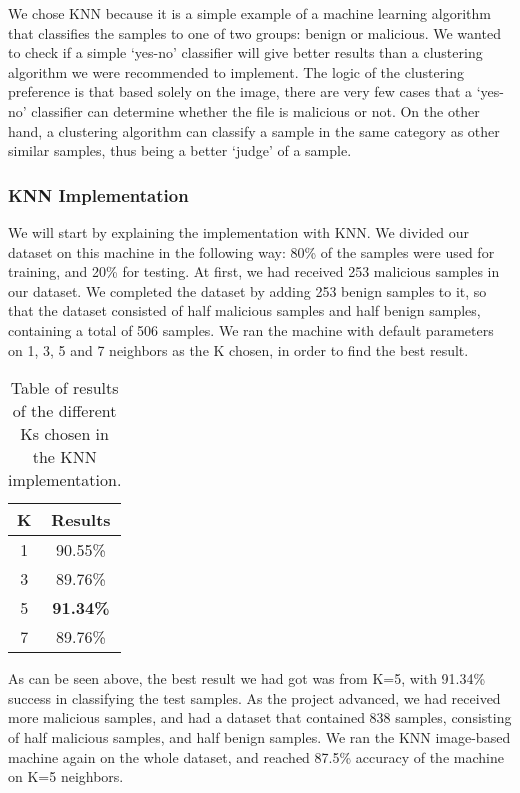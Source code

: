 \documentclass{article}
\begin{document}
\indent	We chose KNN because it is a simple example of a machine learning algorithm that classifies the samples to one of two groups: benign or malicious. We wanted to check if a simple ‘yes-no’ classifier will give better results than a clustering algorithm we were recommended to implement. The logic of the clustering preference is that based solely on the image, there are very few cases that a ‘yes-no’ classifier can determine whether the file is malicious or not. On the other hand, a clustering algorithm can classify a sample in the same category as other similar samples, thus being a better ‘judge’ of a sample.

\subsubsection{KNN Implementation}
\indent We will start by explaining the implementation with KNN. We divided our dataset on this machine in the following way: 80\% of the samples were used for training, and 20\% for testing. At first, we had received 253 malicious samples in our dataset. We completed the dataset by adding 253 benign samples to it, so that the dataset consisted of half malicious samples and half benign samples, containing a total of 506 samples. We ran the machine with default parameters on 1, 3, 5 and 7 neighbors as the K chosen, in order to find the best result.

\begin{table}[htb]
\centering
\begin{tabular}[c]{|c|c|}
\hline
K & Results\\
\hline
1 & 90.55\%\\
\hline
3 & 89.76\%\\
\hline
5 & \textbf{91.34\%}\\
\hline
7 & 89.76\%\\
\hline
\end{tabular}
\caption{Table of results of the different Ks chosen in the KNN implementation.}
\end{table}

\indent As can be seen above, the best result we had got was from K=5, with 91.34\% success in classifying the test samples. 	
\indent As the project advanced, we had received more malicious samples, and had a dataset that contained 838 samples, consisting of half malicious samples, and half benign samples. We ran the KNN image-based machine again on the whole dataset, and reached 87.5\% accuracy of the machine on K=5 neighbors.
\end{document}
